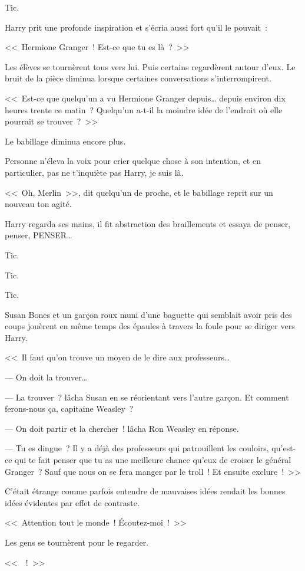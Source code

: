 Tic.

Harry prit une profonde inspiration et s'écria aussi fort qu'il le pouvait~:

<<~Hermione Granger~! Est-ce que tu es là~?~>>

Les élèves se tournèrent tous vers lui. Puis certains regardèrent autour d'eux. Le bruit de la pièce diminua lorsque certaines conversations s'interrompirent.

<<~Est-ce que quelqu'un a vu Hermione Granger depuis… depuis environ dix heures trente ce matin~? Quelqu'un a-t-il la moindre idée de l'endroit où elle pourrait se trouver~?~>>

Le babillage diminua encore plus.

Personne n'éleva la voix pour crier quelque chose à son intention, et en particulier, pas ne t'inquiète pas Harry, je suis là.

<<~Oh, Merlin~>>, dit quelqu'un de proche, et le babillage reprit sur un nouveau ton agité.

Harry regarda ses mains, il fit abstraction des braillements et essaya de penser, penser, PENSER…

Tic.

Tic.

Tic.

Susan Bones et un garçon roux muni d'une baguette qui semblait avoir pris des coups jouèrent en même temps des épaules à travers la foule pour se diriger vers Harry.

<<~Il faut qu'on trouve un moyen de le dire aux professeurs…

--- On doit la trouver…

--- La trouver~? lâcha Susan en se réorientant vers l'autre garçon. Et comment ferons-nous ça, capitaine Weasley~?

--- On doit partir et la chercher~! lâcha Ron Weasley en réponse.

--- Tu es dingue~? Il y a déjà des professeurs qui patrouillent les couloirs, qu'est-ce qui te fait penser que tu as une meilleure chance qu'eux de croiser le général Granger~? Sauf que nous on se fera manger par le troll~! Et ensuite exclure~!~>>

C'était étrange comme parfois entendre de mauvaises idées rendait les bonnes idées évidentes par effet de contraste.

<<~Attention tout le monde~! Écoutez-moi~!~>>

Les gens se tournèrent pour le regarder.

<<~~!~>>

